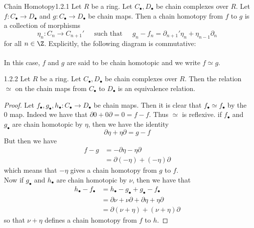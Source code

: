 \documentclass[a4paper]{article}
\begin{document}
\begin{defn}{Chain Homotopy}{1.2.1} Let $R$ be a ring. Let $C_\bullet,D_\bullet$ be chain complexes over $R$. Let $f:C_\bullet\to D_\bullet$ and $g:C_\bullet\to D_\bullet$ be chain maps. Then a chain homotopy from $f$ to $g$ is a collection of morphisms $$\eta_n:C_n\to C_{n+1}'\;\;\;\;\text{ such that }\;\;\;\;g_n-f_n=\partial_{n+1}'\eta_n+\eta_{n-1}\partial_n$$ for all $n\in\Z$. Explicitly, the following diagram is commutative: \\
\\
In this case, $f$ and $g$ are said to be chain homotopic and we write $f\simeq g$. 
\end{defn}

\begin{lmm}{}{1.2.2} Let $R$ be a ring. Let $C_\bullet,D_\bullet$ be chain complexes over $R$. Then the relation $\simeq$ on the chain maps from $C_\bullet$ to $D_\bullet$ is an equivalence relation. 
\begin{proof}
Let $f_\bullet,g_\bullet,h_\bullet:C_\bullet\to D_\bullet$ be chain maps. Then it is clear that $f_\bullet\simeq f_\bullet$ by the $0$ map. Indeed we have that $\partial 0+0\partial=0=f-f$. Thus $\simeq$ is reflexive. if $f_\bullet$ and $g_\bullet$ are chain homotopic by $\eta$, then we have the identity $$\partial\eta+\eta\partial=g-f$$ But then we have 
\begin{align*}
f-g&=-\partial\eta-\eta\partial\\
&=\partial(-\eta)+(-\eta)\partial
\end{align*}
which means that $-\eta$ gives a chain homotopy from $g$ to $f$. \\

Now if $g_\bullet$ and $h_\bullet$ are chain homotopic by $\nu$, then we have that 
\begin{align*}
h_\bullet-f_\bullet&=h_\bullet-g_\bullet+g_\bullet-f_\bullet\\
&=\partial\nu+\nu\partial+\partial\eta+\eta\partial\\
&=\partial(\nu+\eta)+(\nu+\eta)\partial
\end{align*}
so that $\nu+\eta$ defines a chain homotopy from $f$ to $h$. 
\end{proof}
\end{lmm}
\end{document}
